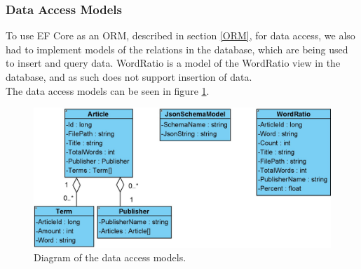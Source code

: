 \subsubsection*{Data Access Models}
To use EF Core as an ORM, described in section \ref{ORM}, for data access, we also had to implement models of the relations in the database, which are being used to insert and query data. 
WordRatio is a model of the WordRatio view in the database, and as such does not support insertion of data.
\\
The data access models can be seen in figure \ref*{fig:DataAccesModels}. 
\begin{figure}[H]
    \centering
    \includegraphics[scale=0.4]{Images/DataAccessModels.jpg}
    \caption{Diagram of the data access models.}
    \label{fig:DataAccesModels}
\end{figure}
